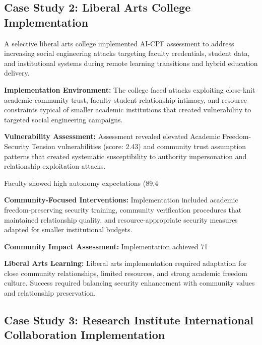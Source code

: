 \documentclass[10pt, twocolumn]{article}
\begin{document}
\subsection{Case Study 2: Liberal Arts College Implementation}

A selective liberal arts college implemented AI-CPF assessment to address increasing social engineering attacks targeting faculty credentials, student data, and institutional systems during remote learning transitions and hybrid education delivery.

\textbf{Implementation Environment:} The college faced attacks exploiting close-knit academic community trust, faculty-student relationship intimacy, and resource constraints typical of smaller academic institutions that created vulnerability to targeted social engineering campaigns.

\textbf{Vulnerability Assessment:} Assessment revealed elevated Academic Freedom-Security Tension vulnerabilities (score: 2.43) and community trust assumption patterns that created systematic susceptibility to authority impersonation and relationship exploitation attacks.

Faculty showed high autonomy expectations (89.4%

\textbf{Community-Focused Interventions:} Implementation included academic freedom-preserving security training, community verification procedures that maintained relationship quality, and resource-appropriate security measures adapted for smaller institutional budgets.

\textbf{Community Impact Assessment:} Implementation achieved 71%

\textbf{Liberal Arts Learning:} Liberal arts implementation required adaptation for close community relationships, limited resources, and strong academic freedom culture. Success required balancing security enhancement with community values and relationship preservation.

\subsection{Case Study 3: Research Institute International Collaboration Implementation}
\end{document}
